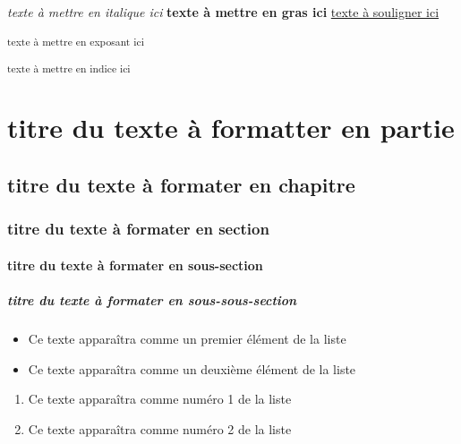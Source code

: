 
\textit{texte à mettre en italique ici}
\textbf{texte à mettre en gras ici}
\uline{texte à souligner ici}

\textsuperscript{texte à mettre en exposant ici} 

\textsubscript{texte à mettre en indice ici}

\part*{titre du texte à formatter en partie}
\chapter*{titre du texte à formater en chapitre}
\section*{titre du texte à formater en section}
\subsection*{titre du texte à formater en sous-section}
\subsubsection*{titre du texte à formater en sous-sous-section}







\begin{itemize}
    \item Ce texte apparaîtra comme un premier élément de la liste
    \item Ce texte apparaîtra comme un deuxième élément de la liste
\end{itemize}

\begin{enumerate} 
    \item Ce texte apparaîtra comme numéro 1 de la liste
    \item Ce texte apparaîtra comme numéro 2 de la liste
\end{enumerate}

